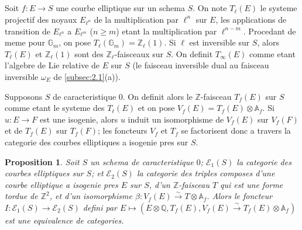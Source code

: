 \documentclass[11pt,reqno]{amsart}
\theoremstyle{plain}
\newtheorem{proposition}[theorem]{Proposition}
\theoremstyle{remark}
\newcommand{\Z}{\mathbb{Z}}
\newcommand{\Q}{\mathbb{Q}}
\newcommand{\A}{\mathbb{A}}
\newcommand{\Gm}{\mathbb{G}_m}
\newcommand{\isom}{\xrightarrow{\sim}}
\numberwithin{equation}{section}
\begin{document}
\subsection{}\label{subsec:3.2}

Soit $f: E \to S$ une courbe elliptique sur un schema $S$. On note $T_\ell(E)$ le systeme projectif des noyaux $E_{\ell^n}$ de la multiplication par $\ell^n$ sur $E$, les applications de transition de $E_{\ell^n}$ a $E_{\ell^m}$ ($n \geq m$) etant la multiplication par $\ell^{n-m}$. Procedant de meme pour $\Gm$, on pose $T_\ell(\Gm) = \Z_\ell(1)$. Si $\ell$ est inversible sur $S$, alors $T_\ell(E)$ et $\Z_\ell(1)$ sont des $\Z_\ell$-faisceaux sur $S$. On definit $T_\infty(E)$ comme etant l'algebre de Lie relative de $E$ sur $S$ (le faisceau inversible dual au faisceau inversible $\omega_E$ de \ref{subsec:2.1}(a)).

Supposons $S$ de caracteristique $0$. On definit alors le $\Z$-faisceau $T_f(E)$ sur $S$ comme etant le systeme des $T_\ell(E)$ et on pose $V_f(E) = T_f(E) \otimes \A_f$. Si $u: E \to F$ est une isogenie, alors $u$ induit un isomorphisme de $V_f(E)$ sur $V_f(F)$ et de $T_f(E)$ sur $T_f(F)$; les foncteurs $V_f$ et $T_f$ se factorisent donc a travers la categorie des courbes elliptiques a isogenie pres sur $S$.

\begin{proposition}\label{prop:3.3}
Soit $S$ un schema de caracteristique $0$; $\mathcal{E}_1(S)$ la categorie des courbes elliptiques sur $S$; et $\mathcal{E}_2(S)$ la categorie des triples composes d'une courbe elliptique a isogenie pres $E$ sur $S$, d'un $\Z$-faisceau $T$ qui est une forme tordue de $\Z^2$, et d'un isomorphisme $\beta: V_f(E) \isom T \otimes \A_f$.
Alors le foncteur $I: \mathcal{E}_1(S) \to \mathcal{E}_2(S)$ defini par $E \mapsto (E \otimes \Q, T_f(E), V_f(E) \isom T_f(E) \otimes \A_f)$ est une equivalence de categories.
\end{proposition}
\end{document}
